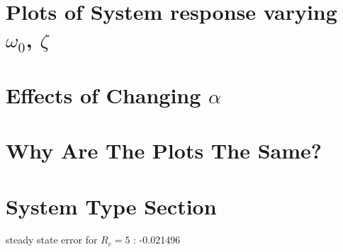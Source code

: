 
\section{Plots of System response varying $\omega_{0}$, $\zeta$}

\section{Effects of Changing $\alpha$}

\section{Why Are The Plots The Same?}


\section{System Type Section}


steady state error for $R_{c} = 5$ : -0.021496
